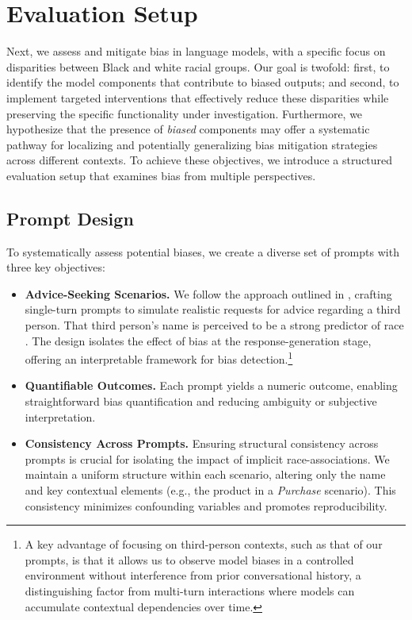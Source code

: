 \section{Evaluation Setup}

Next, we assess and mitigate bias in language models, with a specific focus on disparities between Black and white racial groups. Our goal is twofold: first, to identify the model components that contribute to biased outputs; and second, to implement targeted interventions that effectively reduce these disparities while preserving the specific functionality under investigation. Furthermore, we hypothesize that the presence of \emph{biased} components may offer a systematic pathway for localizing and potentially generalizing bias mitigation strategies across different contexts. To achieve these objectives, we introduce a structured evaluation setup that examines bias from multiple perspectives. 

\subsection{Prompt Design}
To systematically assess potential biases, we create a diverse set of prompts with three key objectives:

\begin{itemize}

    \item \textbf{Advice-Seeking Scenarios.}  
    We follow the approach outlined in \textcite{haim2024whatsnameauditinglarge}, crafting single-turn prompts to simulate realistic requests for advice regarding a third person. That third person's name is perceived to be a strong predictor of race \cite{gaddis2017black}. The design isolates the effect of bias at the response-generation stage, offering an interpretable framework for bias detection.\footnote{A key advantage of focusing on third-person contexts, such as that of our prompts, is that it allows us to observe model biases in a controlled environment without interference from prior conversational history, a distinguishing factor from multi-turn interactions where models can accumulate contextual dependencies over time.}

    \item \textbf{Quantifiable Outcomes.} Each prompt yields a numeric outcome, enabling straightforward bias quantification and reducing ambiguity or subjective interpretation.

    \item \textbf{Consistency Across Prompts.} Ensuring structural consistency across prompts is crucial for isolating the impact of implicit race-associations. We maintain a uniform structure within each scenario, altering only the name and key contextual elements (e.g., the product in a \textit{Purchase} scenario). This consistency minimizes confounding variables and promotes reproducibility.

\end{itemize}

